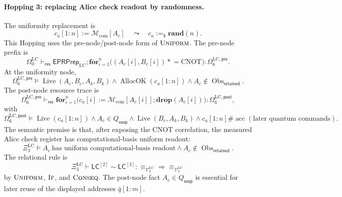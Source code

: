 \documentclass{report}
\theoremstyle{defn_style}
\newcommand{\asteq}{\mathrel{*}=}
\providecommand{\Live}{\operatorname{Live}}
\providecommand{\AllocOK}{\operatorname{AllocOK}}
\providecommand{\acc}{\operatorname{acc}}
\providecommand{\Obs}{\operatorname{Obs}}
\providecommand{\HopLC}[1]{\mathsf{LC}^{[#1]}}
\begin{document}
\paragraph{Hopping 3: replacing Alice check readout by randomness.}
The uniformity replacement is
\[
c_a[1{:}n]:=\mathcal M_{\mathrm{com}}[A_c]
\quad\leadsto\quad
c_a:=_\$\mathbf{rand}(n).
\]
This Hopping uses the pre-node/post-node form of
\(\textsc{Uniform}\).  The pre-node prefix is
\[
\Omega^{\mathrm{LC}}_0
\vdash_{\mathsf{res}}
\mathsf{EPRPrep}_{\mathrm{LC}};
\mathbf{for}_{i=1}^n
\bigl((A_c[i],B_c[i])\asteq\mathrm{CNOT}\bigr)
:
\Omega^{\mathrm{LC},\mathsf{pre}}_{6}.
\tag{LC-H3-UniformPreRun}\label{LC-H3-UniformPreRun}
\]
At the uniformity node,
\[
\Omega^{\mathrm{LC},\mathsf{pre}}_{6}
\models
\Live(A_c,B_c,A_k,B_k)
\land
\AllocOK(c_a[1{:}n])
\land
A_c\notin\Obs_{\mathsf{retained}}.
\tag{LC-H3-UniformPreReq}
\]
The post-node resource trace is
\[
\Omega^{\mathrm{LC},\mathsf{pre}}_{6}
\vdash_{\mathsf{res}}
\mathbf{for}_{i=1}^n
\bigl(
  c_a[i]:=\mathcal M_{\mathrm{com}}[A_c[i]];
  \mathbf{drop}(A_c[i])
\bigr)
:
\Omega^{\mathrm{LC},\mathsf{post}}_{6},
\tag{LC-H3-UniformPostRun}\label{LC-H3-UniformPostRun}
\]
with
\[
\Omega^{\mathrm{LC},\mathsf{post}}_{6}
\models
\Live(c_a[1{:}n])
\land
A_c\in Q_{\mathsf{susp}}
\land
\Live(B_c,A_k,B_k)
\land
c_a[1{:}n]\#\acc(\text{later quantum commands}).
\tag{LC-H3-UniformPostReq}
\]
The semantic premise is that, after exposing the CNOT correlation, the measured
Alice check register has computational-basis uniform readout:
\[
\Xi^{\mathrm{LC}}_3
\models
A_c\ \text{has uniform computational-basis readout}
\land
A_c\notin\Obs_{\mathsf{retained}}.
\tag{LC-H3-UniformSemantic}
\]
The relational rule is
\[
\Xi^{\mathrm{LC}}_3
\vdash
\HopLC{2}\sim\HopLC{3}:
\equiv_{\mathcal V^{\mathrm{LC}}_2}
\Longrightarrow
\equiv_{\mathcal V^{\mathrm{LC}}_3}
\tag{LC-H3-Rel}
\]
by \(\textsc{Uniform}\), \(\textsc{If}\), and \(\textsc{Conseq}\).  The
post-node fact \(A_c\in Q_{\mathsf{susp}}\) is essential for later reuse of the
displayed addresses \(\bar q[1{:}m]\).
\end{document}
